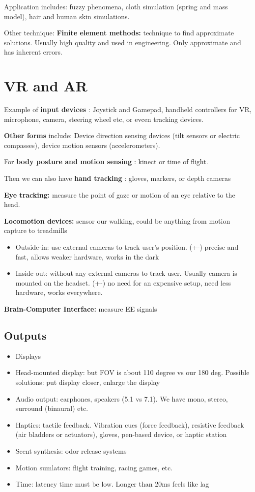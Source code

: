 \documentclass[a4paper]{article}
\begin{document}
Application includes: fuzzy phenomena, cloth simulation (spring and mass model), hair and human skin simulations.

Other technique: \textbf{Finite element methods:} technique to find approximate solutions. Usually high quality and used in engineering. Only approximate and has inherent errors.


\section{VR and AR}
Example of \textbf{input devices} : 
Joystick and Gamepad, handheld controllers for VR, microphone, camera, steering wheel etc, or evcen tracking devices. 

\textbf{Other forms}  include:
Device direction sensing devices (tilt sensors or electric compasses), device motion sensors (accelerometers). 

For \textbf{body posture and motion sensing} : kinect or time of flight. 

Then we can also have\textbf{ hand tracking} : gloves, markers, or depth cameras

\textbf{Eye tracking:}  measure the point of gaze or motion of an eye relative to the head.

\textbf{Locomotion devices:} sensor our walking, could be anything from motion capture to treadmills
\begin{itemize}
    \item Outside-in: use external cameras to track user's position. (+-) precise and fast, allows weaker hardware, works in the dark
    \item Inside-out: without any external cameras to track user. Usually camera is mounted on the headset. (+-) no need for an expensive setup, need less hardware, works everywhere.
\end{itemize}

\textbf{Brain-Computer Interface:} measure EE signals

\subsection*{Outputs}
\begin{itemize}
    \item Displays
    \item Head-mounted display: but FOV is about 110 degree vs our 180 deg. Possible solutions: put display closer, enlarge the display
    \item Audio output: earphones, speakers (5.1 vs 7.1). We have mono, stereo, surround (binaural) etc.
    \item Haptics: tactile feedback. Vibration cues (force feedback), resistive feedback (air bladders or actuators), gloves, pen-based device, or haptic station
    \item Scent synthesis: odor release systems
    \item Motion sumlators: flight training, racing games, etc.
    \item Time: latency time must be low. Longer than 20ms feels like lag
\end{itemize}
\end{document}

